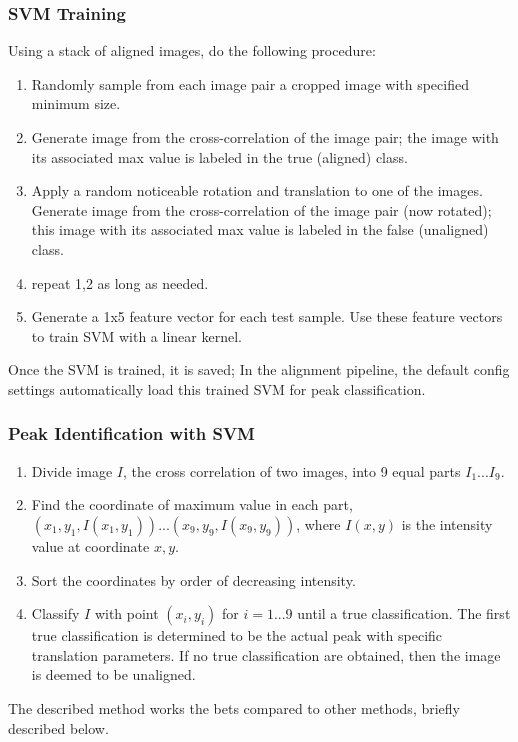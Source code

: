 \documentclass{article}
\begin{document}
\subsubsection{SVM Training}
Using a stack of aligned images, do the following procedure:
\begin{enumerate}
\item Randomly sample from each image pair a cropped image with specified minimum size.
\item Generate image from the cross-correlation of the image pair; the image with its associated max value is labeled in the true (aligned) class.
\item Apply a random noticeable rotation and translation to one of the images. Generate image from the cross-correlation of the image pair (now rotated); this image with its associated max value is labeled in the false (unaligned) class. 
\item repeat 1,2 as long as needed.
\item Generate a 1x5 feature vector for each test sample. Use these feature vectors to train SVM with a linear kernel. 
\end{enumerate}
Once the SVM is trained, it is saved; In the alignment pipeline, the default config settings automatically load this trained SVM for peak classification.

\subsubsection{Peak Identification with SVM}
\begin{enumerate}
\item Divide image $I$, the cross correlation of two images, into 9 equal parts $I_1...I_9$.
\item Find the coordinate of maximum value in each part, $(x_1,y_1, I(x_1, y_1))...(x_9,y_9, I(x_9,y_9))$, where $I(x,y)$ is the intensity value at coordinate $x,y$. 
\item Sort the coordinates by order of decreasing intensity.
\item Classify $I$ with point $(x_i, y_i)$ for $i=1...9$ until a true classification.
The first true classification is determined to be the actual peak with specific translation parameters. If no true classification are obtained, then the image is deemed to be unaligned. 
\end{enumerate}
The described method works the bets compared to other methods, briefly described below.\\
\end{document}
